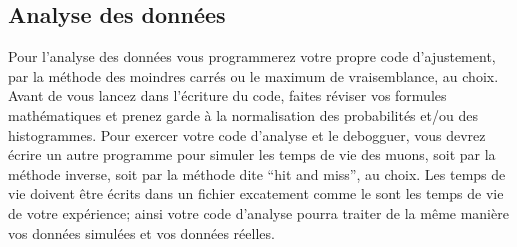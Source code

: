 \subsection{Analyse des données}
Pour l'analyse des données vous programmerez votre propre code d'ajustement, 
par la méthode des moindres carrés ou le maximum de vraisemblance, au choix.
Avant de vous lancez dans l'écriture du code, faites réviser vos formules mathématiques et prenez garde à la normalisation des probabilités et/ou des histogrammes.
Pour exercer votre code d'analyse et le debogguer, vous devrez écrire un autre
programme pour simuler les temps de vie des muons, soit par la méthode inverse, soit par la méthode dite ``hit and miss'', au choix. Les temps de vie doivent être écrits dans un fichier excatement comme le sont les temps de vie de votre
expérience; ainsi votre code d'analyse pourra traiter de la même  manière vos données simulées et vos données réelles.

